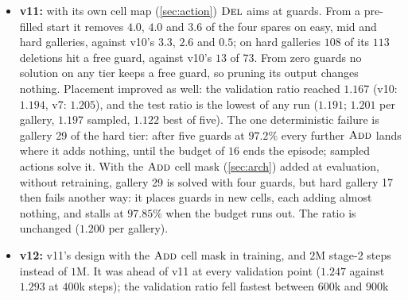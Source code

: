\documentclass[11pt,a4paper]{article}
\begin{document}
\begin{itemize}
        away from any free guard. With free guards drawn brightest, placement improved much
        faster (validation ratio $1.220$ at $1.5$M steps against v9's $1.291$) and settled
        between $1.19$ and $1.23$; whether the redrawing or run-to-run variation caused that,
        one run cannot say. On the test set v10 is level with v7 ($1.215$ against $1.213$
        deterministic, $1.219$ against $1.223$ sampled) and fails one mid gallery. Deletion aim
        on hard galleries did not improve: from a pre-filled start it removes $3.3$, $2.6$ and
        $0.5$ spares on easy, mid and hard galleries, and refused deletions still point far from
        any free guard. The likely cause is in the network rather than the image: the mode and
        the cell are drawn independently from one shared cell map, so a $\DEL$ points with the
        map that $\ADD$, two thirds of all actions, has shaped towards uncovered space, while
        free guards sit where coverage is overlapping.
  \item \textbf{v11:} with its own cell map (\cref{sec:action}) $\DEL$ aims at guards. From a
        pre-filled start it removes $4.0$, $4.0$ and $3.6$ of the four spares on easy, mid and
        hard galleries, against v10's $3.3$, $2.6$ and $0.5$; on hard galleries $108$ of its
        $113$ deletions hit a free guard, against v10's $13$ of $73$. From zero guards no
        solution on any tier keeps a free guard, so pruning its output changes nothing.
        Placement improved as well: the validation ratio reached $1.167$ (v10: $1.194$, v7:
        $1.205$), and the test ratio is the lowest of any run ($1.191$; $1.201$ per gallery,
        $1.197$ sampled, $1.122$ best of five). The one deterministic failure is gallery 29 of the
        hard tier: after five guards at $97.2\%$ every further $\ADD$ lands where it adds
        nothing, until the budget of $16$ ends the episode; sampled actions solve it. With the
        $\ADD$ cell mask (\cref{sec:arch}) added at evaluation, without retraining, gallery 29
        is solved with four guards, but hard gallery 17 then fails another way: it places
        guards in new cells, each adding almost nothing, and stalls at $97.85\%$ when the budget
        runs out. The ratio is unchanged ($1.200$ per gallery).
  \item \textbf{v12:} v11's design with the $\ADD$ cell mask in training, and $2$M stage-2
        steps instead of $1$M. It was ahead of v11 at every validation point ($1.247$ against
        $1.293$ at $400$k steps); the validation ratio fell fastest between $600$k and $900$k

\end{itemize}
\end{document}

